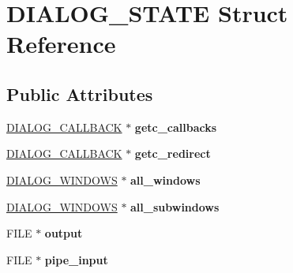\hypertarget{struct_d_i_a_l_o_g___s_t_a_t_e}{}\section{D\+I\+A\+L\+O\+G\+\_\+\+S\+T\+A\+TE Struct Reference}
\label{struct_d_i_a_l_o_g___s_t_a_t_e}
\subsection*{Public Attributes}
\begin{DoxyCompactItemize}
\item 
\hyperlink{struct__dlg__callback}{D\+I\+A\+L\+O\+G\+\_\+\+C\+A\+L\+L\+B\+A\+CK} $\ast$ {\bfseries getc\+\_\+callbacks}\hypertarget{struct_d_i_a_l_o_g___s_t_a_t_e_a951f1fb3f56df04ea3b939194ea6eb5a}{}\label{struct_d_i_a_l_o_g___s_t_a_t_e_a951f1fb3f56df04ea3b939194ea6eb5a}

\item 
\hyperlink{struct__dlg__callback}{D\+I\+A\+L\+O\+G\+\_\+\+C\+A\+L\+L\+B\+A\+CK} $\ast$ {\bfseries getc\+\_\+redirect}\hypertarget{struct_d_i_a_l_o_g___s_t_a_t_e_a6e8f4cff38c718d7adea8ef2939aa581}{}\label{struct_d_i_a_l_o_g___s_t_a_t_e_a6e8f4cff38c718d7adea8ef2939aa581}

\item 
\hyperlink{struct__dlg__windows}{D\+I\+A\+L\+O\+G\+\_\+\+W\+I\+N\+D\+O\+WS} $\ast$ {\bfseries all\+\_\+windows}\hypertarget{struct_d_i_a_l_o_g___s_t_a_t_e_ae014db1ed8be6ff4b86a589db662bb9f}{}\label{struct_d_i_a_l_o_g___s_t_a_t_e_ae014db1ed8be6ff4b86a589db662bb9f}

\item 
\hyperlink{struct__dlg__windows}{D\+I\+A\+L\+O\+G\+\_\+\+W\+I\+N\+D\+O\+WS} $\ast$ {\bfseries all\+\_\+subwindows}\hypertarget{struct_d_i_a_l_o_g___s_t_a_t_e_abd120104030dfea89dff73a4e727cbd6}{}\label{struct_d_i_a_l_o_g___s_t_a_t_e_abd120104030dfea89dff73a4e727cbd6}

\item 
F\+I\+LE $\ast$ {\bfseries output}\hypertarget{struct_d_i_a_l_o_g___s_t_a_t_e_aa867b1beb344dc9796e161582f744cb2}{}\label{struct_d_i_a_l_o_g___s_t_a_t_e_aa867b1beb344dc9796e161582f744cb2}

\item 
F\+I\+LE $\ast$ {\bfseries pipe\+\_\+input}\hypertarget{struct_d_i_a_l_o_g___s_t_a_t_e_a36d3c0e2d9d29f8120cf9de9ea38b768}{}\label{struct_d_i_a_l_o_g___s_t_a_t_e_a36d3c0e2d9d29f8120cf9de9ea38b768}


\end{DoxyCompactItemize}
